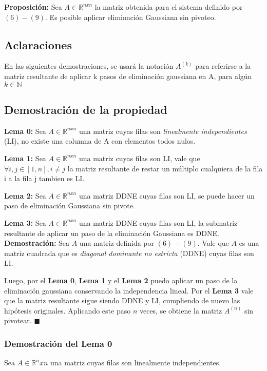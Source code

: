 \textbf{Proposición: } Sea $A \in \mathbb{R}^{nxn}$ la matriz obtenida para el sistema definido por $(6) - (9)$. Es posible aplicar eliminación Gaussiana sin pivoteo.

\subsection{Aclaraciones}

En las siguientes demostraciones, se usará la notación $A^{(k)}$ para referirse a la matriz resultante de aplicar k pasos de eliminación gaussiana en A, para algún $k \in \mathbb{N}$

\subsection{Demostración de la propiedad}
\textbf{Lema 0:} Sea $A \in \mathbb{R}^{nxn}$ una matriz cuyas filas son \textit{linealmente independientes} (LI), no existe una columna de A con elementos todos nulos.

\textbf{Lema 1:} Sea $A \in \mathbb{R}^{nxn}$ una matriz cuyas filas son LI, vale que  $\forall i, j \in [1, n], i \neq j$ la matriz resultante de restar un múltiplo cualquiera de la fila i a la fila j tambien es LI.



\textbf{Lema 2:} Sea $A \in \mathbb{R}^{nxn}$ una matriz DDNE cuyas filas son LI, se puede hacer un paso de eliminación Gaussiana sin pivote.



\textbf{Lema 3:} Sea $A \in \mathbb{R}^{nxn}$ una matriz DDNE cuyas filas son LI, la submatriz resultante de aplicar un paso de la eliminación Gaussiana es DDNE.
\\

\textbf{Demostración:} Sea $A$ una matriz definida por $(6) - (9)$. Vale que $A$ es una matriz cuadrada que es \textit{diagonal dominante no estricta} (DDNE) cuyas filas son LI. 

Luego, por el \textbf{Lema 0}, \textbf{Lema 1} y el \textbf{Lema 2} puedo aplicar un paso de la eliminación gaussiana conservando la independencia lineal. 
Por el \textbf{Lema 3} vale que la matriz resultante sigue siendo DDNE y LI, cumpliendo de nuevo las hipótesis originales. Aplicando este paso $n$ veces, se obtiene la matriz $A^{(n)}$ sin pivotear. $\blacksquare$


\subsubsection{Demostración del Lema 0}
Sea $A \in  \mathbb{R}^nxn$ una matriz cuyas filas son linealmente independientes.

